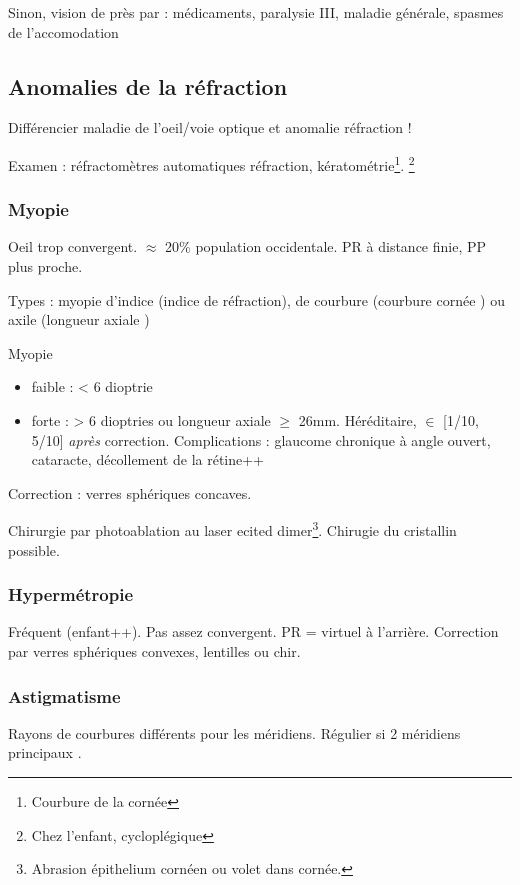 \documentclass[11pt]{article}
\begin{document}
Sinon, \dec vision de près par : médicaments, paralysie III, maladie générale,
spasmes de l'accomodation

\subsection{Anomalies de la réfraction}
\label{sec:org9aa54a0}
Différencier maladie de l'oeil/voie optique et anomalie réfraction !

Examen : réfractomètres automatiques \thus réfraction, kératométrie\footnote{Courbure de la cornée}. \footnote{Chez l'enfant, cycloplégique}

\subsubsection{Myopie}
\label{sec:orgf0b509b}
Oeil trop convergent. \(\approx\) 20\% population occidentale. PR à distance finie,
PP plus proche.

Types : myopie d'indice (\inc indice de réfraction), de courbure (courbure
cornée \inc) ou axile (longueur axiale \inc)

Myopie
\begin{itemize}
\item faible : < 6 dioptrie
\item forte : > 6 dioptries ou longueur axiale \(\ge\) 26mm. Héréditaire, \(\in\) [1/10,
5/10] \emph{après} correction. Complications : glaucome chronique à angle ouvert,
cataracte, décollement de la rétine++
\end{itemize}

Correction : verres sphériques concaves.

Chirurgie par photoablation au laser ecited dimer\footnote{Abrasion épithelium cornéen ou volet dans cornée.}. Chirugie du cristallin
possible.

\subsubsection{Hypermétropie}
\label{sec:orgdad5fe6}
Fréquent (enfant++). Pas assez convergent. PR = virtuel à l'arrière. Correction
par verres sphériques convexes, lentilles ou chir.

\subsubsection{Astigmatisme}
\label{sec:org6ead89f}
Rayons de courbures différents pour les méridiens. Régulier si 2 méridiens
principaux \bot.
\end{document}
